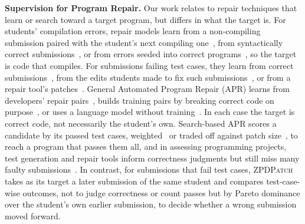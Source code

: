 \documentclass[conference]{IEEEtran}
\begin{document}
\noindent\textbf{Supervision for Program Repair.} Our work relates to repair techniques that learn or search toward a target program, but differs in what the target is. For students' compilation errors, repair models learn from a non-compiling submission paired with the student's next compiling one~\cite{ahmed2018compilation}, from syntactically correct submissions~\cite{bhatia2018neuro}, or from errors seeded into correct programs~\cite{gupta2017deepfix,yasunaga2020graph}, so the target is code that compiles. For submissions failing test cases, they learn from correct submissions~\cite{pu2016sk_p}, from the edits students made to fix such submissions~\cite{rolim2017learning}, or from a repair tool's patches~\cite{koutcheme2023training}. General Automated Program Repair (APR) learns from developers' repair pairs~\cite{tufano2019empirical,lutellier2020coconut}, builds training pairs by breaking correct code on purpose~\cite{yasunaga2021break,ye2022selfapr}, or uses a language model without training~\cite{xia2022less}. In each case the target is correct code, not necessarily the student's own. Search-based APR scores a candidate by its passed test cases, weighted~\cite{le2011genprog} or traded off against patch size~\cite{yuan2018arja}, to reach a program that passes them all, and in assessing programming projects, test generation and repair tools inform correctness judgments but still miss many faulty submissions~\cite{gu2025can}. In contrast, for submissions that fail test cases, \textsc{ZPDPatch} takes as its target a later submission of the same student and compares test-case-wise outcomes, not to judge correctness or count passes but by Pareto dominance over the student's own earlier submission, to decide whether a wrong submission moved forward.
\end{document}
